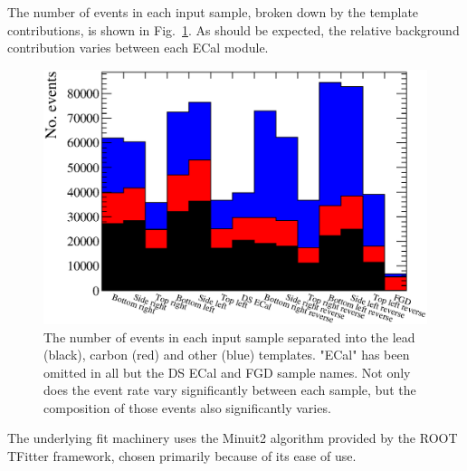 The number of events in each input sample, broken down by the template contributions, is shown in Fig.~\ref{fig:NominalMCTemplates}.  As should be expected, the relative background contribution varies between each ECal module.
\begin{figure}
  \centering
  \includegraphics[width=15cm]{images/measurement/rate_fit/MC_Templates_Nominal.eps}
  \caption{The number of events in each input sample separated into the lead (black), carbon (red) and other (blue) templates.  "ECal" has been omitted in all but the DS ECal and FGD sample names.  Not only does the event rate vary significantly between each sample, but the composition of those events also significantly varies.}
  \label{fig:NominalMCTemplates}
\end{figure}
\newline
\newline
The underlying fit machinery uses the Minuit2 algorithm provided by the ROOT TFitter framework, chosen primarily because of its ease of use.


